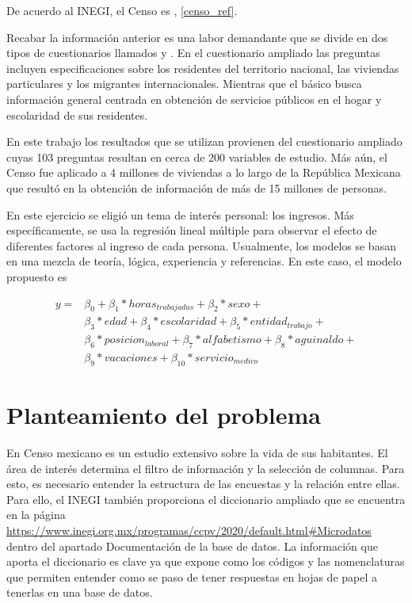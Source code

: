 De acuerdo al INEGI, el Censo es , \ref{censo_ref}. 

Recabar la información anterior es una labor demandante que se divide en dos tipos de cuestionarios llamados  y . En el cuestionario ampliado las preguntas incluyen especificaciones sobre los residentes del territorio nacional, las viviendas particulares y los migrantes internacionales. Mientras que el básico busca información general centrada en obtención de servicios públicos en el hogar y escolaridad de sus residentes. 

En este trabajo los resultados que se utilizan provienen del cuestionario ampliado cuyas 103 preguntas resultan en cerca de 200 variables de estudio. Más aún, el Censo fue aplicado a 4 millones de viviendas a lo largo de la República Mexicana que resultó en la obtención de información de más de 15 millones de personas.

En este ejercicio se eligió un tema de interés personal: los ingresos. Más específicamente, se usa la regresión lineal múltiple para observar el efecto de diferentes factores al ingreso de cada persona. Usualmente, los modelos se basan en una mezcla de teoría, lógica, experiencia y referencias. En este caso, el modelo propuesto es 


\begin{equation} \label{modelo_final}
    \begin{aligned}
    	y =& \beta_0 + \beta_1*horas_{trabajadas} + \beta_2*sexo + \\
    	&\beta_3*edad + \beta_4*escolaridad + \beta_5*entidad_{trabajo} + \\ &\beta_6*posicion_{laboral} + \beta_7*alfabetismo + \beta_8*aguinaldo + \\ &\beta_9*vacaciones + \beta_{10}*servicio_{medico}
    \end{aligned}
\end{equation}


\section{Planteamiento del problema}
En Censo mexicano es un estudio extensivo sobre la vida de sus habitantes. El área de interés determina el filtro de información y la selección de columnas. Para esto, es necesario entender la estructura de las encuestas y la relación entre ellas. Para ello, el INEGI también proporciona el diccionario ampliado que se encuentra en la página \url{https://www.inegi.org.mx/programas/ccpv/2020/default.html#Microdatos} dentro del apartado \textsf{Documentación de la base de datos}. La información que aporta el diccionario es clave ya que expone como los códigos y las nomenclaturas que permiten entender como se paso de tener respuestas en hojas de papel a tenerlas en una base de datos.

